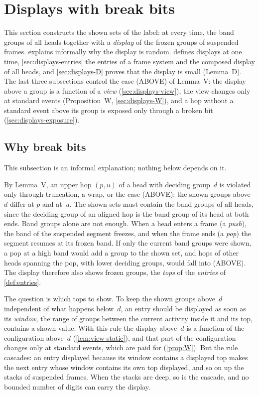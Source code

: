 \section{Displays with break bits}\label{sec:displays}

This section constructs the shown sets of the label: at every time, the band groups of all heads together with a \emph{display}
of the frozen groups of suspended frames.  explains informally why the display is random.
 defines displays at one time, \cref{sec:displays-entries} the entries of a frame system and the composed
display of all heads, and \cref{sec:displays-D} proves that the display is small (Lemma~D). The last three subsections control the
case (ABOVE) of Lemma~V: the display above a group is a function of a \emph{view} (\cref{sec:displays-view}), the view changes
only at standard events (Proposition~W, \cref{sec:displays-W}), and a hop without a standard event above its group is exposed only
through a broken bit (\cref{sec:displays-exposure}).

\subsection{Why break bits}\label{sec:displays-why}

This subsection is an informal explanation; nothing below depends on it.

By Lemma~V, an upper hop $(p,u)$ of a head with deciding group~$d$ is violated only through truncation, a wrap, or the case
(ABOVE): the shown groups above~$d$ differ at $p$ and at~$u$. The shown sets must contain the band groups of all heads, since the
deciding group of an aligned hop is the band group of its head at both ends. Band groups alone are not enough. When a head enters
a frame (a \emph{push}), the band of the suspended segment freezes, and when the frame ends (a \emph{pop}) the segment resumes at
its frozen band. If only the current band groups were shown, a pop at a high band would add a group to the shown set, and hops of
other heads spanning the pop, with lower deciding groups, would fall into (ABOVE). The display therefore also shows frozen groups,
the \emph{tops} of the \emph{entries} of \cref{def:entries}.

The question is which tops to show. To keep the shown groups above~$d$ independent of what happens below~$d$, an entry should be
displayed as soon as its \emph{window}, the range of groups between the current activity inside it and its top, contains a shown
value. With this rule the display above~$d$ is a function of the configuration above~$d$ (\cref{lem:view-static}), and that part of
the configuration changes only at standard events, which are paid for (\cref{prop:W}). But the rule cascades: an entry displayed
because its window contains a displayed top makes the next entry whose window contains its own top displayed, and so on up the
stacks of suspended frames. When the stacks are deep, so is the cascade, and no bounded number of digits can carry the display.

